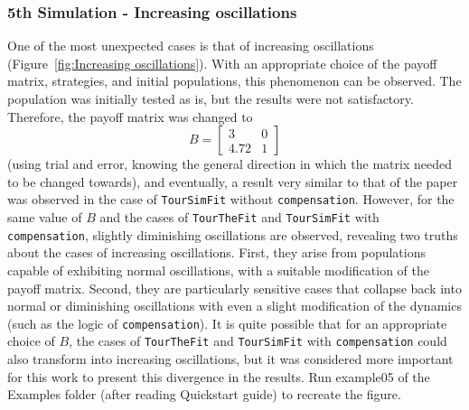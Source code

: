 \documentclass[12pt]{article}
\begin{document}
\subsubsection{5th Simulation - Increasing oscillations}
One of the most unexpected cases is that of increasing oscillations (Figure~\ref{fig:Increasing oscillations}). With an appropriate choice of the payoff matrix, strategies, and initial populations, this phenomenon can be observed. The population was initially tested as is, but the results were not satisfactory. Therefore, the payoff matrix was changed to 
\[
B = \begin{bmatrix} 3 & 0 \\ 4.72 & 1 \end{bmatrix}
\]
(using trial and error, knowing the general direction in which the matrix needed to be changed towards), and eventually, a result very similar to that of the paper was observed in the case of \texttt{TourSimFit} without \texttt{compensation}. However, for the same value of \( B \) and the cases of \texttt{TourTheFit} and \texttt{TourSimFit} with \texttt{compensation}, slightly diminishing oscillations are observed, revealing two truths about the cases of increasing oscillations. First, they arise from populations capable of exhibiting normal oscillations, with a suitable modification of the payoff matrix. Second, they are particularly sensitive cases that collapse back into normal or diminishing oscillations with even a slight modification of the dynamics (such as the logic of \texttt{compensation}). It is quite possible that for an appropriate choice of \( B \), the cases of \texttt{TourTheFit} and \texttt{TourSimFit} with \texttt{compensation} could also transform into increasing oscillations, but it was considered more important for this work to present this divergence in the results. Run example05 of the Examples folder (after reading Quickstart guide) to recreate the figure.
\end{document}
